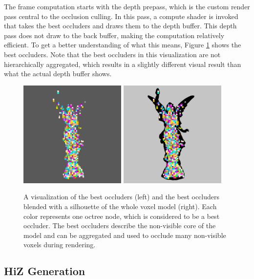 The frame computation starts with the depth prepass, which is the custom render pass central to the 
occlusion culling. In this pass, a compute shader is invoked that takes the best occluders and draws 
them to the depth buffer. This depth pass does not draw to the back buffer, making the computation 
relatively efficient. To get a better understanding of what this means, Figure \ref{fig:best-occluder-viz} 
shows the best occluders. Note that the best occluders in this visualization are not hierarchically 
aggregated, which results in a slightly different visual result than what the actual depth buffer shows. 

\begin{figure}[h]
    \centering
    \includegraphics[width=200px]{images/graphics/lucy-best-occluders-viz.jpg}
    \includegraphics[width=200px]{images/graphics/lucy-best-occluders-diff-viz.jpg}
    \caption{A visualization of the best occluders (left) and the best occluders blended with a silhouette 
    of the whole voxel model (right). Each color represents one octree node, which is considered to be a best occluder.
    The best occluders describe the non-visible core of the model and can be aggregated and used to occlude 
    many non-visible voxels during rendering.}
    \label{fig:best-occluder-viz}
\end{figure}

\subsection*{HiZ Generation} \label{subsec-highz-generation}

